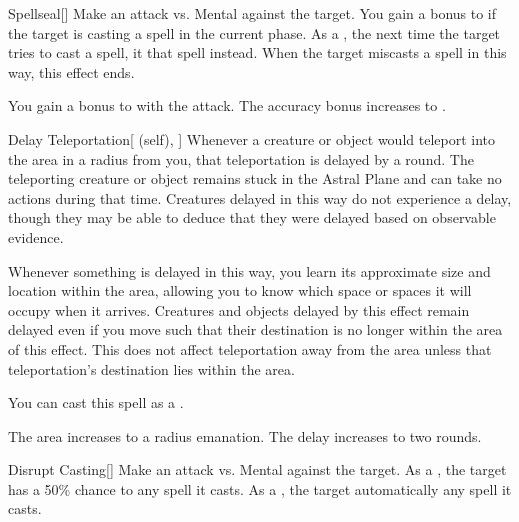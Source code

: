 \lowercase{\hypertarget{spell:Spellseal}{}}\label{spell:Spellseal}
\begin{freeability}[Rank 3]{\hypertarget{spell:Spellseal}{Spellseal}}[]
Make an attack vs. Mental against the target.
You gain a  bonus to  if the target is casting a spell in the current phase.
\hit As a , the next time the target tries to cast a spell, it  that spell instead.
When the target miscasts a spell in this way, this effect ends.

\rankline
{} You gain a  bonus to  with the attack.
 The accuracy bonus increases to .
\end{freeability}
\vspace{0.25em}



\lowercase{\hypertarget{spell:Delay Teleportation}{}}\label{spell:Delay Teleportation}
\begin{attuneability}[Rank 4]{\hypertarget{spell:Delay Teleportation}{Delay Teleportation}}[ (self), ]
Whenever a creature or object would teleport into the area in a \arealarge radius  from you, that teleportation is delayed by a round.
The teleporting creature or object remains stuck in the Astral Plane and can take no actions during that time.
Creatures delayed in this way do not experience a delay, though they may be able to deduce that they were delayed based on observable evidence.

Whenever something is delayed in this way, you learn its approximate size and location within the area, allowing you to know which space or spaces it will occupy when it arrives.
Creatures and objects delayed by this effect remain delayed even if you move such that their destination is no longer within the area of this effect.
This does not affect teleportation away from the area unless that teleportation's destination lies within the area.

You can cast this spell as a .

\rankline
{} The area increases to a \areahuge radius emanation.
 The delay increases to two rounds.
\end{attuneability}
\vspace{0.25em}



\lowercase{\hypertarget{spell:Disrupt Casting}{}}\label{spell:Disrupt Casting}
\begin{freeability}[Rank 4]{\hypertarget{spell:Disrupt Casting}{Disrupt Casting}}[]
Make an attack vs. Mental against the target.
\hit As a , the target has a 50\% chance to  any spell it casts.
\crit As a , the target automatically  any spell it casts.
\end{freeability}
\vspace{0.25em}



